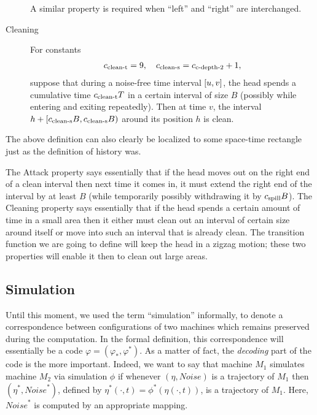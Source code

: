 \documentclass[12pt]{memoir}
\def\B{B}
\newcommand{\Noise}{\mathit{Noise}}
\newcommand{\Tu}{T}
\newcommand{\cns}[1]{c_{\textrm{\upshape #1}}}
\newcommand{\cCleanS}{\cns{clean-s}}
\newcommand{\cCleanT}{\cns{clean-t}}
\newcommand{\cCDepth}[1]{\cns{c-depth-#1}}
\newcommand{\cSpill}{\cns{spill}}
\begin{document}
\begin{definition}[Trajectory]
\begin{description}
A similar property is required when ``left'' and ``right'' are interchanged.

\item[Cleaning] \label{i:def.traj.cleaning}
For constants
\begin{align}\label{eq:cns.clean}
        \cCleanT =9,
\quad   \cCleanS =\cCDepth2 +1,
 \end{align}
suppose that during a noise-free time interval \( [u,v] \), 
the head spends a cumulative time 
 \( \cCleanT \Tu \)  in a certain interval of size \( \B \)
(possibly while entering and exiting repeatedly).
Then at time \( v \), the interval 
\( h+\lint{\cCleanS \B}{\cCleanS\B}  \) around its position \( h \) is clean.
\end{description}

The above definition can also clearly be localized to some space-time
rectangle just as the definition of history was.
\end{definition}

The Attack property says essentially that if the head moves out on the right end
of a clean interval then next time it comes in, it must extend the right end of the interval 
by at least \( \B \) (while temporarily possibly withdrawing it by \( \cSpill\B \)).
The Cleaning property says essentially 
that if the head spends a certain amount of time in a small area
then it either must clean out an interval of certain size around itself or move into
such an interval that is already clean.
The transition function we are going to define will keep the head in a zigzag motion;
these two properties will enable it then to clean out large areas.


\subsection{Simulation}

Until this moment, we used the term ``simulation'' informally, to denote
a correspondence between configurations of
two machines which remains preserved during the computation.
In the formal definition, this correspondence will essentially be a code
\( \varphi=(\varphi_{*},\varphi^{*}) \).
As a matter of fact, the \emph{decoding} part of the code is the more important.
Indeed, we want to say that machine \( M_{1} \) simulates machine \( M_{2} \) via
simulation \( \phi \) if whenever \( (\eta, \Noise) \) is a trajectory of \( M_{1} \) 
then \( (\eta^{*},\Noise^{*}) \),
defined by \( \eta^{*}(\cdot,t)=\phi^{*}(\eta(\cdot,t)) \), is a
trajectory of \( M_{1} \).
Here, \( \Noise^{*} \) is computed by an appropriate mapping.
\end{document}
